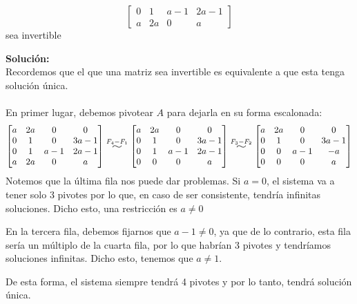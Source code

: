 \documentclass[12pt]{article}
\newenvironment{solucion}
{\begin{mdframed}[backgroundcolor=black!10]
		{\bf Solución:}\\
	}
	{
	\end{mdframed}
}
\newenvironment{preguntas}
{\begin{enumerate}\itemsep12pt
	}
	{
	\end{enumerate}
}
\newcommand{\widesim}[2][1.5]{
	\mathrel{\overset{#2}{\scalebox{#1}[1]{$\sim$}}}
}
\begin{document}
\begin{preguntas}
$$\begin{bmatrix}
	0 & 1 & a-1 & 2a-1\\
	a & 2a & 0 & a
	\end{bmatrix}$$
	sea invertible
\begin{solucion}
Recordemos que el que una matriz sea invertible es equivalente a que esta tenga solución única.\\\\En primer lugar, debemos pivotear $A$ para dejarla en su forma escalonada:
		$$\begin{bmatrix}
		a & 2a & 0 & 0 \\
		0 & 1 & 0 & 3a-1\\
		0 & 1 & a-1 & 2a-1\\
		a & 2a & 0 & a
		\end{bmatrix} \widesim{F_4-F_1}
		\begin{bmatrix}
		a & 2a & 0 & 0 \\
		0 & 1 & 0 & 3a-1\\
		0 & 1 & a-1 & 2a-1\\
		0 & 0 & 0 & a
		\end{bmatrix} \widesim{F_3-F_2}
		\begin{bmatrix}
		a & 2a & 0 & 0 \\
		0 & 1 & 0 & 3a-1\\
		0 & 0 & a-1 & -a\\
		0 & 0 & 0 & a
		\end{bmatrix}$$
		Notemos que la última fila nos puede dar problemas. Si $a=0$, el sistema va a tener solo 3 pivotes por lo que, en caso de ser consistente, tendría infinitas soluciones. Dicho esto, una restricción es $a\neq 0$
		
		En la tercera fila, debemos fijarnos que $a-1 \neq 0$, ya que de lo contrario, esta fila sería un múltiplo de la cuarta fila, por lo que habrían 3 pivotes y tendríamos soluciones infinitas. Dicho esto, tenemos que $a \neq 1$.
		
		De esta forma, el sistema siempre tendrá 4 pivotes y por lo tanto, tendrá solución única.
		

\end{solucion}
\end{preguntas}
\end{document}

